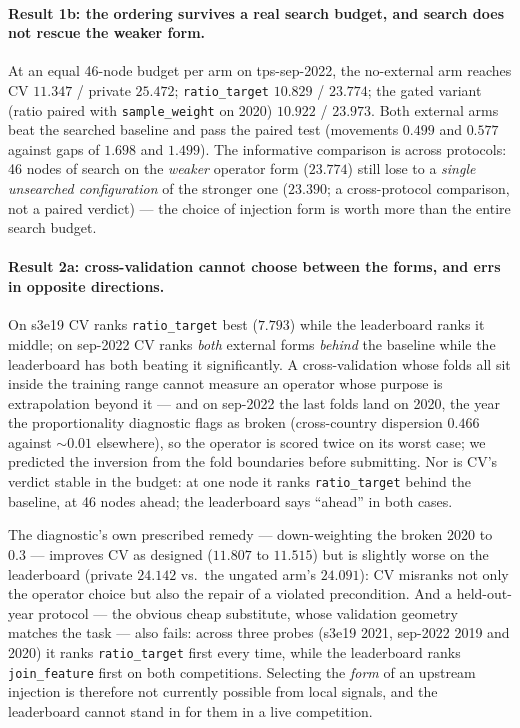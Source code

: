 \documentclass[11pt,a4paper]{article}
\begin{document}
\paragraph{Result 1b: the ordering survives a real search budget, and search does not rescue the weaker form.} At an equal 46-node budget per arm on tps-sep-2022, the no-external arm reaches CV $11.347$ / private $25.472$; \texttt{ratio\_target} $10.829$ / $23.774$; the gated variant (ratio paired with \texttt{sample\_weight} on 2020) $10.922$ / $23.973$. Both external arms beat the searched baseline and pass the paired test (movements $0.499$ and $0.577$ against gaps of $1.698$ and $1.499$). The informative comparison is across protocols: 46 nodes of search on the \emph{weaker} operator form ($23.774$) still lose to a \emph{single unsearched configuration} of the stronger one ($23.390$; a cross-protocol comparison, not a paired verdict) --- the choice of injection form is worth more than the entire search budget.

\paragraph{Result 2a: cross-validation cannot choose between the forms, and errs in opposite directions.} On s3e19 CV ranks \texttt{ratio\_target} best ($7.793$) while the leaderboard ranks it middle; on sep-2022 CV ranks \emph{both} external forms \emph{behind} the baseline while the leaderboard has both beating it significantly. A cross-validation whose folds all sit inside the training range cannot measure an operator whose purpose is extrapolation beyond it --- and on sep-2022 the last folds land on 2020, the year the proportionality diagnostic flags as broken (cross-country dispersion $0.466$ against ${\sim}0.01$ elsewhere), so the operator is scored twice on its worst case; we predicted the inversion from the fold boundaries before submitting. Nor is CV's verdict stable in the budget: at one node it ranks \texttt{ratio\_target} behind the baseline, at 46 nodes ahead; the leaderboard says ``ahead'' in both cases.

The diagnostic's own prescribed remedy --- down-weighting the broken 2020 to $0.3$ --- improves CV as designed ($11.807$ to $11.515$) but is slightly worse on the leaderboard (private $24.142$ vs.\ the ungated arm's $24.091$): CV misranks not only the operator choice but also the repair of a violated precondition. And a held-out-year protocol --- the obvious cheap substitute, whose validation geometry matches the task --- also fails: across three probes (s3e19 2021, sep-2022 2019 and 2020) it ranks \texttt{ratio\_target} first every time, while the leaderboard ranks \texttt{join\_feature} first on both competitions. Selecting the \emph{form} of an upstream injection is therefore not currently possible from local signals, and the leaderboard cannot stand in for them in a live competition.
\end{document}
